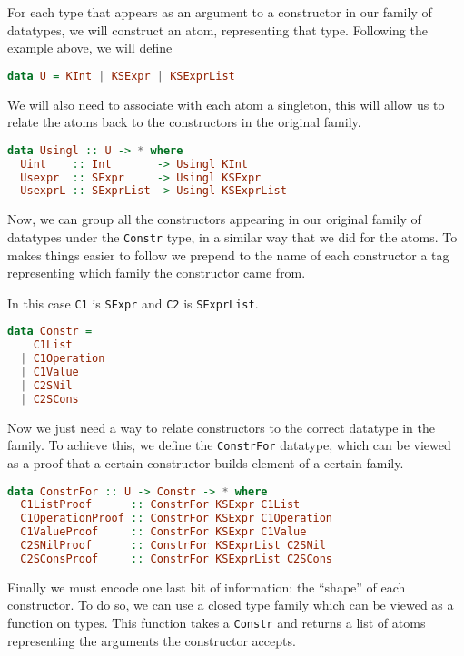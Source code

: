 \documentclass[11pt]{article}
\begin{document}
For each type that appears as an argument to a constructor in our family
of datatypes, we will construct an atom, representing that type.
Following the example above, we will define

\begin{lstlisting}[language=haskell]
data U = KInt | KSExpr | KSExprList
\end{lstlisting}

We will also need to associate with each atom a singleton, this will
allow us to relate the atoms back to the constructors in the original
family.

\begin{lstlisting}[language=haskell]
data Usingl :: U -> * where
  Uint    :: Int       -> Usingl KInt
  Usexpr  :: SExpr     -> Usingl KSExpr
  UsexprL :: SExprList -> Usingl KSExprList
\end{lstlisting}

Now, we can group all the constructors appearing in our original family
of datatypes under the \texttt{Constr} type, in a similar way that we
did for the atoms. To makes things easier to follow we prepend to the name of each
constructor a tag representing which family the constructor came from.

In this case \texttt{C1} is \texttt{SExpr} and \texttt{C2} is
\texttt{SExprList}.

\begin{lstlisting}[language=haskell]
data Constr =
    C1List
  | C1Operation
  | C1Value
  | C2SNil
  | C2SCons
\end{lstlisting}

Now we just need a way to relate constructors to the correct datatype in
the family. To achieve this, we define the \texttt{ConstrFor} datatype,
which can be viewed as a proof that a certain constructor builds element
of a certain family.

\begin{lstlisting}[language=haskell]
data ConstrFor :: U -> Constr -> * where
  C1ListProof      :: ConstrFor KSExpr C1List
  C1OperationProof :: ConstrFor KSExpr C1Operation
  C1ValueProof     :: ConstrFor KSExpr C1Value
  C2SNilProof      :: ConstrFor KSExprList C2SNil
  C2SConsProof     :: ConstrFor KSExprList C2SCons
\end{lstlisting}

Finally we must encode one last bit of information: the ``shape'' of
each constructor. To do so, we can use a closed type family which can be
viewed as a function on types. This function takes a \texttt{Constr} and
returns a list of atoms representing the arguments the constructor
accepts.
\end{document}
